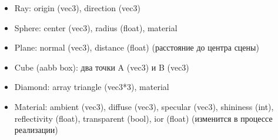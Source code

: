 \begin{itemize}
    \item Ray: origin (vec3), direction (vec3)
    \item Sphere: center (vec3), radius (float), material
    \item Plane: normal (vec3), distance (float) (расстояние до центра сцены)
    \item Cube (aabb box): два точки A (vec3) и B (vec3)
    \item Diamond: array triangle (vec3*3), material
    \item Material: ambient (vec3), diffuse (vec3), specular (vec3), shininess (int),
    reflectivity (float), transparent (bool), ior (float) (изменится в процессе реализации)
\end{itemize}









